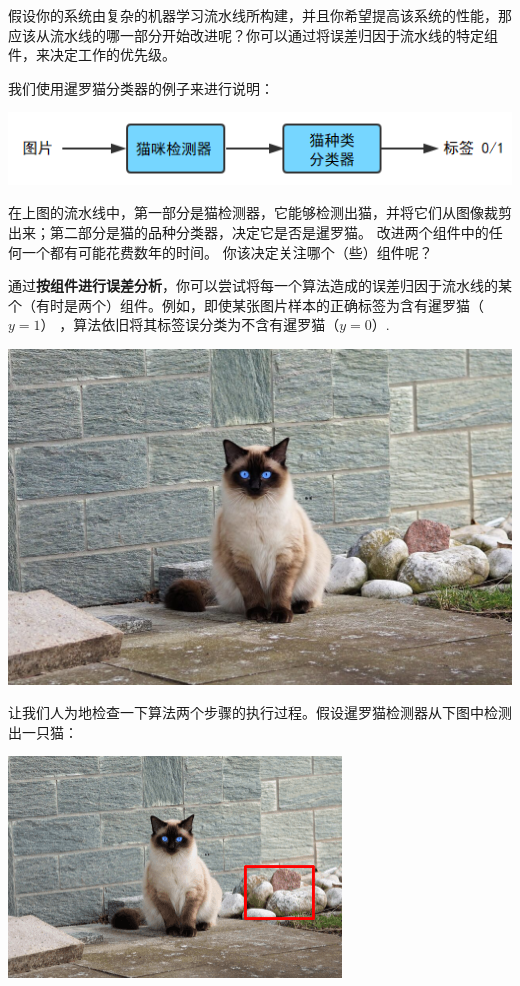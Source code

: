假设你的系统由复杂的机器学习流水线所构建，并且你希望提高该系统的性能，那应该从流水线的哪一部分开始改进呢？你可以通过将误差归因于流水线的特定组件，来决定工作的优先级。

我们使用暹罗猫分类器的例子来进行说明：

\includegraphics{./img/ch51_04.png}

在上图的流水线中，第一部分是猫检测器，它能够检测出猫，并将它们从图像裁剪出来；第二部分是猫的品种分类器，决定它是否是暹罗猫。
改进两个组件中的任何一个都有可能花费数年的时间。
你该决定关注哪个（些）组件呢？

通过\textbf{按组件进行误差分析}，你可以尝试将每一个算法造成的误差归因于流水线的某个（有时是两个）组件。例如，即使某张图片样本的正确标签为含有暹罗猫（
\(y=1\)） ，算法依旧将其标签误分类为不含有暹罗猫（\(y=0\)）.

\includegraphics{./img/ch53_01.png}

让我们人为地检查一下算法两个步骤的执行过程。假设暹罗猫检测器从下图中检测出一只猫：

\includegraphics{./img/ch53_02.png}

